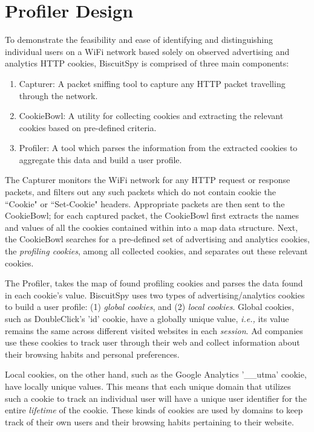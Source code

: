 \section{Profiler Design}
\label{sec:design}

To demonstrate the feasibility and ease of identifying and distinguishing individual users on a WiFi network based solely on observed advertising and analytics HTTP cookies, BiscuitSpy is comprised of three main components: 
\begin{enumerate}
\item Capturer: A packet sniffing tool to capture any HTTP packet travelling through the network.
\item CookieBowl: A utility for collecting cookies and extracting the relevant cookies based on pre-defined criteria.
\item Profiler: A tool which parses the information from the extracted cookies to aggregate this data and build a user profile.
\end{enumerate}

The Capturer monitors the WiFi network for any HTTP request or response packets, and filters out any such packets which do not contain cookie the ``Cookie" or ``Set-Cookie" headers. 
Appropriate packets are then sent to the CookieBowl; for each captured packet, the CookieBowl first extracts the names and values of all the cookies contained within into a map data structure.
Next, the CookieBowl searches for a pre-defined set of advertising and analytics cookies, the \emph{profiling cookies}, among all collected cookies, and separates out these relevant cookies.

The Profiler, takes the map of found profiling cookies and parses the data found in each cookie's value. 
BiscuitSpy uses two types of advertising/analytics cookies to build a user profile: (1) \emph{global cookies}, and (2) \emph{local cookies}.
Global cookies, such as DoubleClick's 'id' cookie, have a globally unique value, \emph{i.e.,} its value remains the same across different visited websites in each \emph{session}. 
Ad companies use these cookies to track user through their web and collect information about their browsing habits and personal preferences.

Local cookies, on the other hand, such as the Google Analytics '\_\_utma' cookie, have locally unique values.
This means that each unique domain that utilizes such a cookie to track an individual user will have a unique user identifier for the entire \emph{lifetime} of the cookie.
These kinds of cookies are used by domains to keep track of their own users and their browsing habits pertaining to their website.

